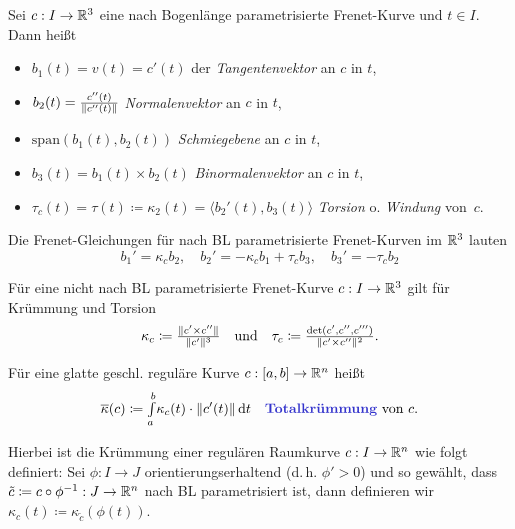 \documentclass{cheat-sheet}
\newcommand{\Intabdt}[1]{\Int{a}{b}{#1}{t}}
\newcommand{\Span}{\mathrm{span}}
\begin{document}
\begin{defn}
  Sei $c : I \to \mathbb{R}^3$ eine nach Bogenlänge parametrisierte Frenet-Kurve und $t \in I$. Dann heißt
  \begin{itemize}
    \item $b_1(t) = v(t) = c'(t)$ der \emph{Tangentenvektor} an $c$ in $t$,
    \item $b_2(t) = \tfrac{c''(t)}{\lVert c''(t)\rVert}$ \emph{Normalenvektor} an $c$ in $t$,
    \item $\Span(b_1(t), b_2(t))$ \emph{Schmiegebene} an $c$ in $t$,
    \item $b_3(t) = b_1(t) \times b_2(t)$ \emph{Binormalenvektor} an $c$ in $t$,
    \item $\tau_c(t) = \tau(t) \coloneqq \kappa_2(t) = \langle b_2'(t) , b_3(t) \rangle$ \emph{Torsion} o. \emph{Windung} von~$c$.
  \end{itemize}
\end{defn}

\begin{bem}
  Die Frenet-Gleichungen für nach BL parametrisierte Frenet-Kurven im $\mathbb{R}^3$ lauten
  \[
      b_1' = \kappa_c b_2, \quad
      b_2' = - \kappa_c b_1 + \tau_c b_3, \quad
      b_3' = - \tau_c b_2
  \]
\end{bem}


\begin{bem}
  Für eine nicht nach BL parametrisierte Frenet-Kurve $c : I \to \mathbb{R}^3$ gilt für Krümmung und Torsion
  \[
    \kappa_c \coloneqq \tfrac{\lVert c' \times c''\rVert}{\lVert c'\rVert^3}
    \quad \text{und} \quad
    \tau_c \coloneqq \tfrac{\det(c', c'', c''')}{\lVert c' \times c''\rVert^2}.
  \]
\end{bem}


\begin{defn}
  Für eine glatte geschl. reguläre Kurve $c : \left[ a, b \right] \to \mathbb{R}^n$ heißt
  \[
    \overline\kappa(c) \coloneqq \Intabdt{\kappa_c(t) \cdot \norm{c'(t)}}
    \quad \text{\emph{Totalkrümmung} von $c$.}
  \]

  Hierbei ist die Krümmung einer regulären Raumkurve $c : I \to \mathbb{R}^n$ wie folgt definiert:
  Sei $\phi : I \to J$ orientierungserhaltend
  (d.\,h. $\phi' > 0$) und so gewählt,
  dass $\tilde{c} \coloneqq c \circ \phi^{-1} : J \to \mathbb{R}^n$ nach
  BL parametrisiert ist, dann definieren wir $\kappa_c(t) \coloneqq \kappa_{\tilde{c}}(\phi(t))$.
\end{defn}
\end{document}
